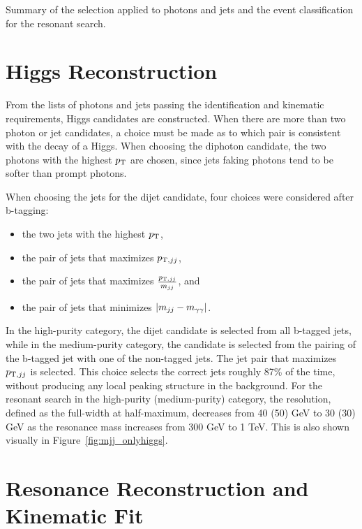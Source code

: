 \begin{table}[htbp!]
  \centering
  \renewcommand{\arraystretch}{1.4}
  \caption{Summary of the selection applied to photons and jets and the event classification
for the resonant search.}
  
  \label{table:gencut}
\end{table}

\section{Higgs Reconstruction\label{sec:higgsreconstruction}}

From the lists of photons and jets passing the identification and kinematic requirements, Higgs
candidates are constructed. When there are more than two photon or jet candidates, a choice
must be made as to which pair is consistent with the decay of a Higgs. When
choosing the diphoton candidate, the two photons with the highest $p_{\rm T}$ are chosen, since
jets faking photons tend to be softer than prompt photons.

When choosing the jets for the dijet candidate, four choices were considered after b-tagging:
\begin{itemize}
\item the two jets with the highest $p_{\rm T}$,
\item the pair of jets that maximizes $p_{{\rm T},jj}$,
\item the pair of jets that maximizes $\frac{p_{{\rm T},jj}}{m_{jj}}$, and
\item the pair of jets that minimizes $|m_{jj}-m_{\gamma\gamma}|$.
\end{itemize}
In the high-purity category, the dijet candidate is selected from all b-tagged jets,
while in the medium-purity category, the candidate is selected from the pairing of the b-tagged jet
with one of the non-tagged jets.
The jet pair that maximizes $p_{{\rm T},jj}$ is selected. 
This choice selects the correct jets roughly 87\% of the time, without producing any local peaking
structure in the background. For the resonant search
in the high-purity (medium-purity) category, the resolution, defined as the full-width at half-maximum,
decreases from 40 (50) GeV to 30 (30) GeV as the resonance mass increases from 300 GeV to 1 TeV.
This is also shown visually in Figure~\ref{fig:mjj_onlyhiggs}.

\section{Resonance Reconstruction and Kinematic Fit\label{sec:Xreconstruction}}

